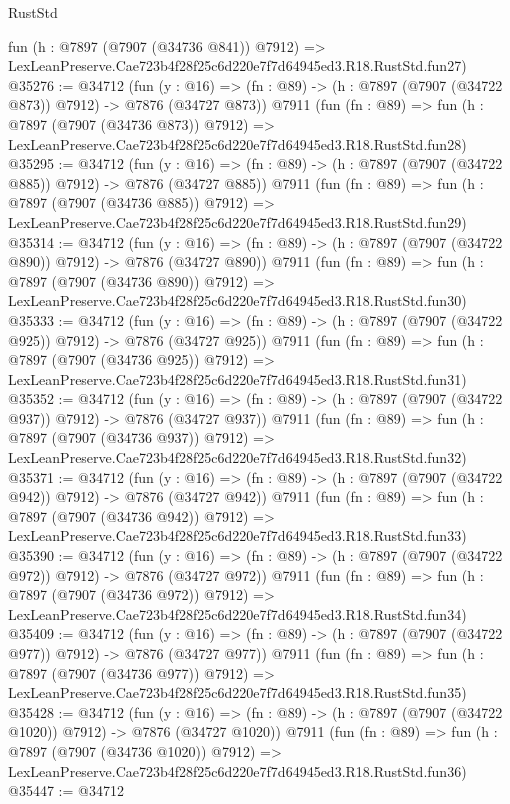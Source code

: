 \begin{lexlean}{RustStd}
\begin{coremodule}
    fun (h : @7897 (@7907 (@34736 @841)) @7912) =>
    LexLeanPreserve.Cae723b4f28f25c6d220e7f7d64945ed3.R18.RustStd.fun27)
@35276 := @34712
    (fun (y : @16) => (fn : @89) -> (h : @7897 (@7907 (@34722 @873)) @7912) -> @7876 (@34727 @873))
    @7911
    (fun (fn : @89) =>
    fun (h : @7897 (@7907 (@34736 @873)) @7912) =>
    LexLeanPreserve.Cae723b4f28f25c6d220e7f7d64945ed3.R18.RustStd.fun28)
@35295 := @34712
    (fun (y : @16) => (fn : @89) -> (h : @7897 (@7907 (@34722 @885)) @7912) -> @7876 (@34727 @885))
    @7911
    (fun (fn : @89) =>
    fun (h : @7897 (@7907 (@34736 @885)) @7912) =>
    LexLeanPreserve.Cae723b4f28f25c6d220e7f7d64945ed3.R18.RustStd.fun29)
@35314 := @34712
    (fun (y : @16) => (fn : @89) -> (h : @7897 (@7907 (@34722 @890)) @7912) -> @7876 (@34727 @890))
    @7911
    (fun (fn : @89) =>
    fun (h : @7897 (@7907 (@34736 @890)) @7912) =>
    LexLeanPreserve.Cae723b4f28f25c6d220e7f7d64945ed3.R18.RustStd.fun30)
@35333 := @34712
    (fun (y : @16) => (fn : @89) -> (h : @7897 (@7907 (@34722 @925)) @7912) -> @7876 (@34727 @925))
    @7911
    (fun (fn : @89) =>
    fun (h : @7897 (@7907 (@34736 @925)) @7912) =>
    LexLeanPreserve.Cae723b4f28f25c6d220e7f7d64945ed3.R18.RustStd.fun31)
@35352 := @34712
    (fun (y : @16) => (fn : @89) -> (h : @7897 (@7907 (@34722 @937)) @7912) -> @7876 (@34727 @937))
    @7911
    (fun (fn : @89) =>
    fun (h : @7897 (@7907 (@34736 @937)) @7912) =>
    LexLeanPreserve.Cae723b4f28f25c6d220e7f7d64945ed3.R18.RustStd.fun32)
@35371 := @34712
    (fun (y : @16) => (fn : @89) -> (h : @7897 (@7907 (@34722 @942)) @7912) -> @7876 (@34727 @942))
    @7911
    (fun (fn : @89) =>
    fun (h : @7897 (@7907 (@34736 @942)) @7912) =>
    LexLeanPreserve.Cae723b4f28f25c6d220e7f7d64945ed3.R18.RustStd.fun33)
@35390 := @34712
    (fun (y : @16) => (fn : @89) -> (h : @7897 (@7907 (@34722 @972)) @7912) -> @7876 (@34727 @972))
    @7911
    (fun (fn : @89) =>
    fun (h : @7897 (@7907 (@34736 @972)) @7912) =>
    LexLeanPreserve.Cae723b4f28f25c6d220e7f7d64945ed3.R18.RustStd.fun34)
@35409 := @34712
    (fun (y : @16) => (fn : @89) -> (h : @7897 (@7907 (@34722 @977)) @7912) -> @7876 (@34727 @977))
    @7911
    (fun (fn : @89) =>
    fun (h : @7897 (@7907 (@34736 @977)) @7912) =>
    LexLeanPreserve.Cae723b4f28f25c6d220e7f7d64945ed3.R18.RustStd.fun35)
@35428 := @34712
    (fun (y : @16) =>
    (fn : @89) -> (h : @7897 (@7907 (@34722 @1020)) @7912) -> @7876 (@34727 @1020))
    @7911
    (fun (fn : @89) =>
    fun (h : @7897 (@7907 (@34736 @1020)) @7912) =>
    LexLeanPreserve.Cae723b4f28f25c6d220e7f7d64945ed3.R18.RustStd.fun36)
@35447 := @34712

\end{coremodule}
\end{lexlean}
